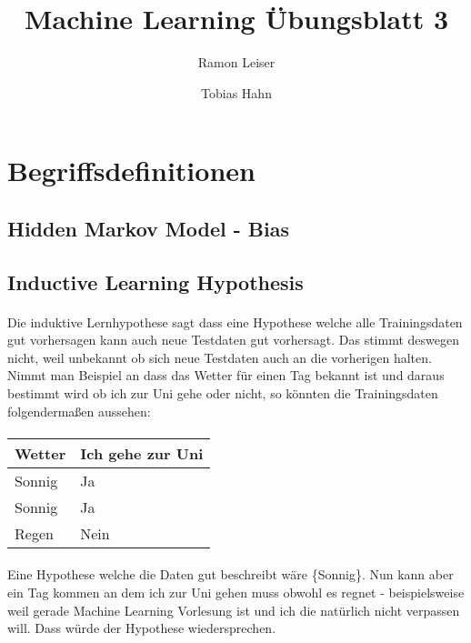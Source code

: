 \documentclass[a4paper]{article}
\title{Machine Learning Übungsblatt 3}
\author{Ramon Leiser\and Tobias Hahn}
\begin{document}
\maketitle
\newpage
\section{Begriffsdefinitionen}

\subsection{Hidden Markov Model - Bias}
\paragraph{}

\subsection{Inductive Learning Hypothesis}
\paragraph{}
Die induktive Lernhypothese sagt dass eine Hypothese welche alle Trainingsdaten gut vorhersagen kann auch neue Testdaten gut vorhersagt. Das stimmt deswegen nicht, weil unbekannt ob sich neue Testdaten auch an die vorherigen halten. Nimmt man Beispiel an dass das Wetter für einen Tag bekannt ist und daraus bestimmt wird ob ich zur Uni gehe oder nicht, so könnten die Trainingsdaten folgendermaßen aussehen:

\paragraph{}
\begin{tabular}{|l|l|}
	\hline
	Wetter & Ich gehe zur Uni \\\hline
	Sonnig & Ja \\\hline
	Sonnig & Ja  \\\hline
	Regen & Nein  \\\hline
\end{tabular}

\paragraph{}
Eine Hypothese welche die Daten gut beschreibt wäre \{Sonnig\}. Nun kann aber ein Tag kommen an dem ich zur Uni gehen muss obwohl es regnet - beispielsweise weil gerade Machine Learning Vorlesung ist und ich die natürlich nicht verpassen will. Dass würde der Hypothese wiedersprechen.
\end{document}
